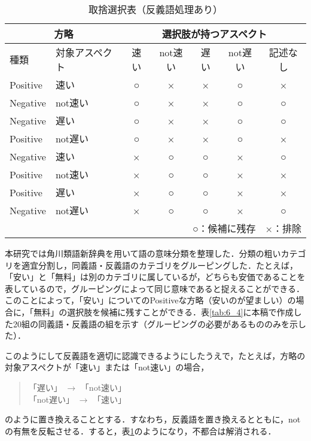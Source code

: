 \documentclass[japanese]{jnlp_1.3a}
\begin{document}
\begin{table}[t]
  \caption{取捨選択表（反義語処理あり）}
  \begin{center}
    \begin{tabular}{|l|l||c|c|c|c|c|} \hline
      \multicolumn{2}{|c||}{方略} & 
      \multicolumn{5}{|c|}{選択肢が持つアスペクト}\\ \hline
      種類     & 対象アスペクト & 速い & not速い & 遅い & not遅い & 記述なし\\
      \hline \hline
      Positive & 速い    & ○ & × & × & ○ & ×\\ \hline
      Negative & not速い & ○ & × & × & ○ & ○\\ \hline
      Negative & 遅い    & ○ & × & × & ○ & ○\\ \hline
      Positive & not遅い & ○ & × & × & ○ & ×\\ \hline
      Negative & 速い    & × & ○ & ○ & × & ○\\ \hline
      Positive & not速い & × & ○ & ○ & × & ×\\ \hline
      Positive & 遅い    & × & ○ & ○ & × & ×\\ \hline
      Negative & not遅い & × & ○ & ○ & × & ○\\ \hline
      \multicolumn{7}{r}{○：候補に残存　×：排除}\\
    \end{tabular}
    \label{tab:6_5}
  \end{center}
\end{table}

本研究では角川類語新辞典を用いて語の意味分類を整理した．分類の粗いカテゴリを適宜分割し，同義語・反義語のカテゴリをグルーピングした．たとえば，「安い」と「無料」は別のカテゴリに属しているが，どちらも安価であることを表しているので，グルーピングによって同じ意味であると捉えることができる．このことによって，「安い」についてのPositiveな方略（安いのが望ましい）の場合に，「無料」の選択肢を候補に残すことができる．表\ref{tab:6_4}に本稿で作成した20組の同義語・反義語の組を示す（グルーピングの必要があるもののみを示した）．

このようにして反義語を適切に認識できるようにしたうえで，たとえば，方略の対象アスペクトが「速い」または「not速い」の場合，
	\begin{quote}
	「遅い」 $\rightarrow$ 「not速い」\\
	「not遅い」 $\rightarrow$ 「速い」
	\end{quote}
のように置き換えることとする．すなわち，反義語を置き換えるとともに，notの有無を反転させる．すると，表\ref{tab:6_5}のようになり，不都合は解消される．
\end{document}
